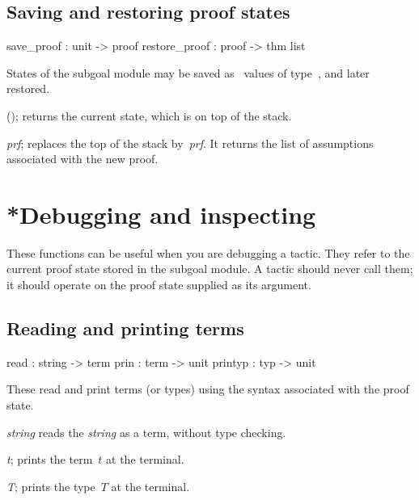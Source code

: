 \subsection{Saving and restoring proof states}
\begin{ttbox} 
save_proof    : unit -> proof
restore_proof : proof -> thm list
\end{ttbox}
States of the subgoal module may be saved as \ML\ values of
type~, and later restored.

\begin{ttdescription}
\item[\ttindexbold{save_proof}();]  
returns the current state, which is on top of the stack.

\item[\ttindexbold{restore_proof} {\it prf};]
  replaces the top of the stack by~{\it prf}.  It returns the list of
  assumptions associated with the new proof.
\end{ttdescription}


\section{*Debugging and inspecting}
These functions can be useful when you are debugging a tactic.  They refer
to the current proof state stored in the subgoal module.  A tactic
should never call them; it should operate on the proof state supplied as its
argument.

\subsection{Reading and printing terms}
\begin{ttbox} 
read    : string -> term
prin    : term -> unit
printyp : typ -> unit
\end{ttbox}
These read and print terms (or types) using the syntax associated with the
proof state.

\begin{ttdescription}
\item[\ttindexbold{read} {\it string}]  
reads the {\it string} as a term, without type checking.

\item[\ttindexbold{prin} {\it t};]  
prints the term~$t$ at the terminal.

\item[\ttindexbold{printyp} {\it T};]  
prints the type~$T$ at the terminal.
\end{ttdescription}

